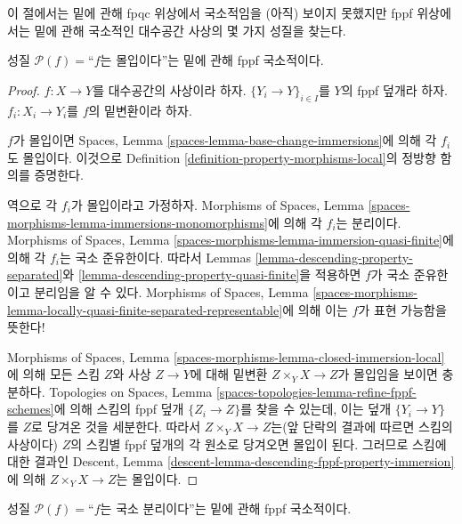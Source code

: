 \noindent
이 절에서는 밑에 관해 fpqc 위상에서 국소적임을 (아직) 보이지 못했지만
fppf 위상에서는 밑에 관해 국소적인 대수공간 사상의 몇 가지 성질을
찾는다.

\begin{lemma}
\label{lemma-descending-fppf-property-immersion}
성질 $\mathcal{P}(f)=$``$f$는 몰입이다''는 밑에 관해 fppf 국소적이다.
\end{lemma}

\begin{proof}
$f:X\to Y$를 대수공간의 사상이라 하자. $\{Y_i\to Y\}_{i\in I}$를
$Y$의 fppf 덮개라 하자. $f_i:X_i\to Y_i$를 $f$의 밑변환이라 하자.

\medskip\noindent
$f$가 몰입이면 Spaces, Lemma \ref{spaces-lemma-base-change-immersions}에
의해 각 $f_i$도 몰입이다. 이것으로 Definition
\ref{definition-property-morphisms-local}의 정방향 함의를 증명한다.

\medskip\noindent
역으로 각 $f_i$가 몰입이라고 가정하자. Morphisms of Spaces, Lemma
\ref{spaces-morphisms-lemma-immersions-monomorphisms}에 의해 각 $f_i$는
분리이다. Morphisms of Spaces, Lemma
\ref{spaces-morphisms-lemma-immersion-quasi-finite}에 의해 각 $f_i$는
국소 준유한이다. 따라서 Lemmas \ref{lemma-descending-property-separated}와
\ref{lemma-descending-property-quasi-finite}을 적용하면 $f$가 국소
준유한이고 분리임을 알 수 있다. Morphisms of Spaces, Lemma
\ref{spaces-morphisms-lemma-locally-quasi-finite-separated-representable}에
의해 이는 $f$가 표현 가능함을 뜻한다!

\medskip\noindent
Morphisms of Spaces, Lemma
\ref{spaces-morphisms-lemma-closed-immersion-local}에 의해 모든 스킴 $Z$와
사상 $Z\to Y$에 대해 밑변환 $Z\times_YX\to Z$가 몰입임을 보이면
충분하다. Topologies on Spaces, Lemma
\ref{spaces-topologies-lemma-refine-fppf-schemes}에 의해 스킴의 fppf 덮개
$\{Z_i\to Z\}$를 찾을 수 있는데, 이는 덮개 $\{Y_i\to Y\}$를 $Z$로
당겨온 것을 세분한다. 따라서 $Z\times_YX\to Z$는(앞 단락의
결과에 따르면 스킴의 사상이다) $Z$의 스킴별 fppf 덮개의 각 원소로
당겨오면 몰입이 된다.
그러므로 스킴에 대한 결과인 Descent, Lemma
\ref{descent-lemma-descending-fppf-property-immersion}에 의해
$Z\times_YX\to Z$는 몰입이다.
\end{proof}

\begin{lemma}
\label{lemma-descending-fppf-property-locally-separated}
성질 $\mathcal{P}(f)=$``$f$는 국소 분리이다''는 밑에 관해 fppf
국소적이다.
\end{lemma}

